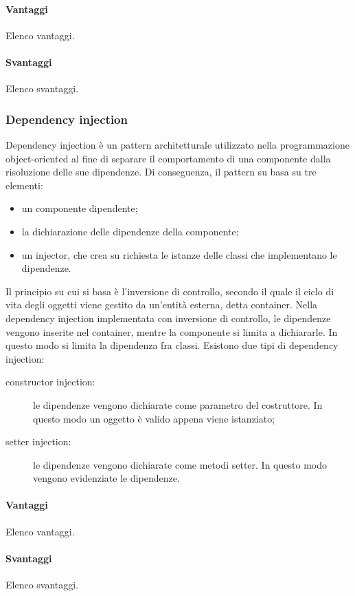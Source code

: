 \documentclass[../SpecificaTecnica.tex]{subfiles}
\begin{document}
\begin{appendices}
				\paragraph{Vantaggi}
					Elenco vantaggi.
				\paragraph{Svantaggi}
					Elenco svantaggi.
			\subsubsection{Dependency injection}
				Dependency injection è un pattern architetturale utilizzato nella programmazione object-oriented al fine di separare il comportamento di una componente dalla risoluzione delle sue dipendenze. Di conseguenza, il pattern su basa su tre elementi:
				\begin{itemize}
					\item un componente dipendente;
					\item la dichiarazione delle dipendenze della componente;
					\item un injector, che crea su richiesta le istanze delle classi che implementano le dipendenze.
				\end{itemize}
				
				Il principio su cui si basa è l'inversione di controllo, secondo il quale il ciclo di vita degli oggetti viene gestito da un'entità esterna, detta container. Nella dependency injection implementata con inversione di controllo, le dipendenze vengono inserite nel container, mentre la componente si limita a dichiararle. In questo modo si limita la dipendenza fra classi. Esistono due tipi di dependency injection:
				
				\begin{description}
					\item[constructor injection:] le dipendenze vengono dichiarate come parametro del costruttore. In questo modo un oggetto è valido appena viene istanziato;
					\item[setter injection:] le dipendenze vengono dichiarate come metodi setter. In questo modo vengono evidenziate le dipendenze.
				\end{description}
				\paragraph{Vantaggi}
					Elenco vantaggi.
				\paragraph{Svantaggi}
					Elenco svantaggi.

\end{appendices}
\end{document}
